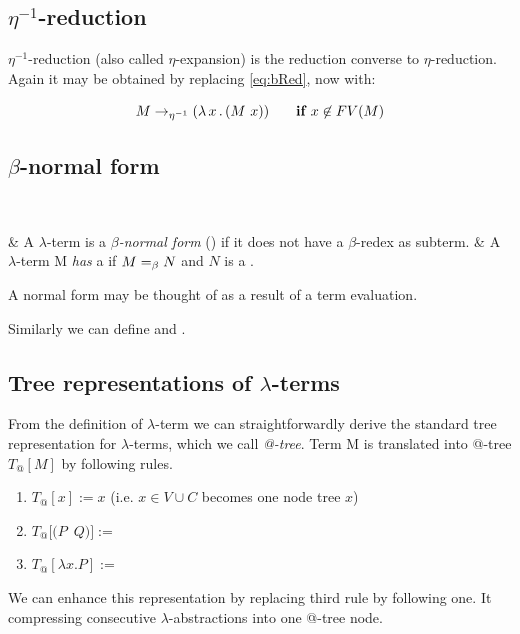 \documentclass[12pt,a4paper]{report}
\makeatletter
\newcommand{\lterm}{$\lambda$-term\xspace}
\newcommand{\lterms}{$\lambda$-terms\xspace}
\newcommand{\atTree}{@-tree\xspace}
\makeatother
\begin{document}
\subsection{$\eta^{-1}$-reduction}

$\eta^{-1}$-reduction (also called $\eta$-expansion) is 
the reduction converse to $\eta$-reduction.
Again it may be obtained by replacing \ref{eq:bRed}, now with:  

$$M \rightarrow_{\eta^{-1}} ( \lambda \, x \, . \, (M~x) ) \textbf{ ~~~~if } x \not\in FV(M) $$




\subsection{$\beta$-normal form}

~\begin{easylist}[enumerate]
& A \lterm is a \textit{$\beta$-normal form} (\bnf) 
if it does not have a $\beta$-redex as subterm.
& A \lterm M \textit{has} a \bnf if $M =_\beta N$
and $N$ is a \bnf.\\
\end{easylist}
A normal form may be thought of as a result of a term evaluation. 

Similarly we can define \enf and \benf.

\subsection{Tree representations of \lterms}
\label{tree-reps}

\newcommand{\sexprTree}{sexpr-tree\xspace}
\newcommand{\SexprTree}{Sexpr-tree\xspace}



From the definition of \lterm we can straightforwardly derive 
the standard tree representation for \lterms, which we call 
\textit{\atTree}. Term M is 
translated into \atTree $T_@[M]$ by following rules.


\begin{enumerate}
	\item $T_@[x] := x$ (i.e. $x \in V \cup C$ becomes one node tree $x$)
	\item \mbox{$T_@[(P$ $Q)] := $  }
	\item \mbox{$T_@[\lambda x . P] := $  }
\end{enumerate}


We can enhance this representation by replacing third rule
by following one. It compressing consecutive 
$\lambda$-abstractions into one \atTree node. \\
\end{document}
